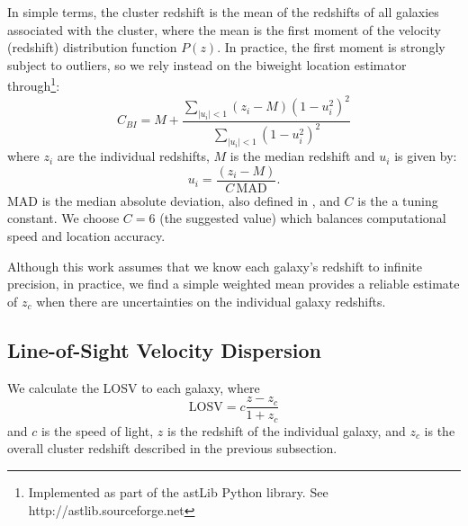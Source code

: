 \documentclass[fleqn,usenatbib]{mnras}
\begin{document}
In simple terms, the cluster redshift is the mean of the redshifts of all galaxies associated with the cluster, where the mean is the first moment of the velocity (redshift) distribution function $P(z)$. In practice, the first moment is strongly subject to outliers, so we rely instead on the biweight location estimator \citep{Beers1990} through\footnote{Implemented as part of the {\sc astLib} Python library. See \hbox{http://astlib.sourceforge.net}}:
\begin{equation}
C_{BI} = M + \frac{\sum_{|u_i| < 1} (z_i - M)(1-u_i^2)^2}{\sum_{|u_i| < 1}(1-u_i^2)^2}
\end{equation}
where $z_i$ are the individual redshifts, $M$ is the median redshift and $u_i$ is given by:
\begin{equation}
	u_i = \frac{(z_i - M)}{C\,\mathrm{MAD}}.
\end{equation}
MAD is the median absolute deviation, also defined in \cite{Beers1990}, and $C$ is the a tuning constant. We choose $C=6$ (the suggested value) which balances computational speed and location accuracy. 

Although this work assumes that we know each galaxy's redshift to infinite precision, in practice, we find a simple weighted mean provides a reliable estimate of $z_c$ when there are uncertainties on the individual galaxy redshifts. 

\subsection{Line-of-Sight Velocity Dispersion}\label{sec: LOSVD}
We calculate the LOSV to each galaxy, where
\begin{equation}
	\mathrm{LOSV} = c\frac{z - z_c}{1+z_c}
\end{equation}
and $c$ is the speed of light, $z$ is the redshift of the individual galaxy, and $z_c$ is the overall cluster redshift described in the previous subsection.
\end{document}
